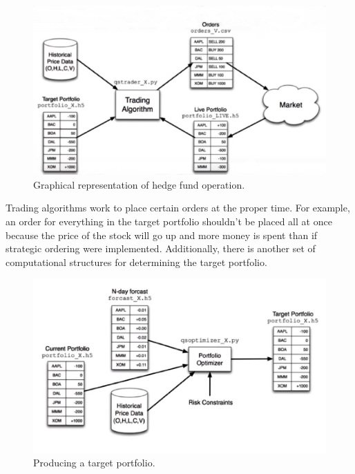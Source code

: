 \begin{figure}[h!]
\begin{center}
\includegraphics[scale=.4]{images/operation.JPG}
\caption{Graphical representation of hedge fund operation.}
\end{center}
\end{figure}

Trading algorithms work to place certain orders at the proper time. For example, an order for everything in the target portfolio shouldn't be placed all at once because the price of the stock will go up and more money is spent than if strategic ordering were implemented. Additionally, there is another set of computational structures for determining the target portfolio.

\begin{figure}[h!]
\begin{center}
\includegraphics[scale=.75]{images/target.JPG}
\caption{Producing a target portfolio.}
\end{center}
\end{figure}

